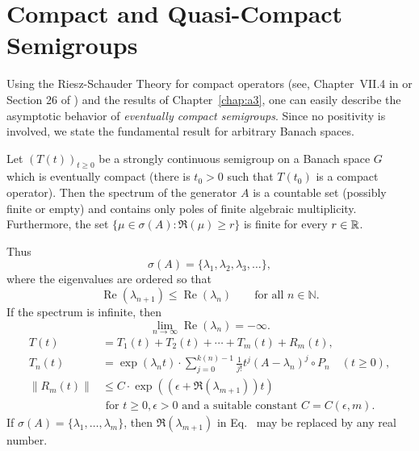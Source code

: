 \section{Compact and Quasi-Compact Semigroups}\label{sec:b4-2}
\hspace{1cm}{\Large by Günther Greiner}
\vspace{.5cm}
\newline
Using the Riesz-Schauder Theory for compact operators (see, \eg
Chapter~VII.4 in \textcite{dunfordschwartz:1958} or Section 26 of \textcite{pietsch:1978}) and the results of Chapter~\ref{chap:a3},  one can easily describe the
asymptotic behavior of \emph{eventually compact semigroups}.
Since no positivity is involved, we state the fundamental result for arbitrary Banach
spaces.
\begin{theorem}\label{thm:b4-2.1}
Let $(T(t))_{t \geq 0}$ be a strongly continuous semigroup on a Banach space $G$ which is eventually compact (\ie  there is $t_{0} > 0$ such that $T(t_{0})$ is a compact operator).
Then the spectrum of the generator $A$ is a countable set (possibly finite or empty) and contains only poles of finite algebraic multiplicity.
Furthermore, the set $\{\mu \in \sigma(A) \colon \Re(\mu) \geq r\}$ is finite for every $r \in \mathbb{R}$.

Thus
    \[
    \sigma(A)=\{\lambda_1,\lambda_2,\lambda_3,\ldots\},
    \]
    where the eigenvalues are ordered so that
    \[
    \operatorname{Re}(\lambda_{n+1})  \leq \operatorname{Re}(\lambda_n)
    \qquad \text{for all } n\in\mathbb{N}.
    \]
    If the spectrum is infinite, then
    \[
    \lim_{n\to\infty}\operatorname{Re}(\lambda_n)=-\infty .
    \]
\begin{equation}\label{eq:b4-2.1}
\begin{aligned}
	T(t) &= T_1(t) + T_2(t) + \cdots + T_m(t) + R_m(t) ,\\
	T_n(t) &= \exp(\lambda_n t) \cdot \sum_{j=0}^{k(n)-1} \frac{1}{j!}t^j(A - \lambda_n)^j \circ P_n 
		\quad (t \geq 0) ,\\
	\|R_m(t)\| & \leq C \cdot \exp((\epsilon +\Re(\lambda_{m+1}))t)\\
			&  \text{ for }  t \geq 0, \epsilon >0  \text{ and a suitable	constant } C=C(\epsilon ,m) .
		\end{aligned}
	\end{equation}
If\/ $\sigma(A) = \{\lambda_{1},\ldots,\lambda_{m}\}$, then $\Re(\lambda_{m+1})$ in Eq.~ may be replaced by any real number.
\end{theorem}

